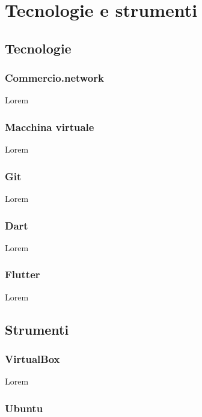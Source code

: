 
\chapter{Tecnologie e strumenti}
\label{cap:tecnologie-strumenti}

\section{Tecnologie}
\subsection*{Commercio.network}

Lorem

\subsection*{Macchina virtuale}

Lorem

\subsection*{Git}

Lorem

\subsection*{Dart}

Lorem

\subsection*{Flutter}

Lorem

\section{Strumenti}
\subsection*{VirtualBox}

Lorem

\subsection*{Ubuntu}


